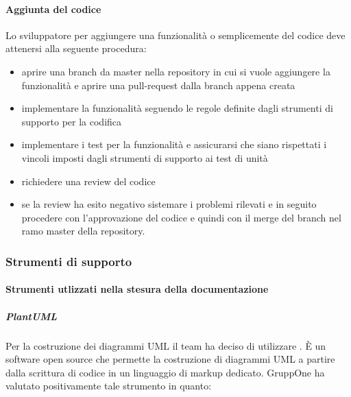 \documentclass[../../norme-di-progetto.tex]{subfiles}
\begin{document}
\paragraph{Aggiunta del codice}%
\label{par:aggiunta_codice}
Lo sviluppatore per aggiungere una funzionalità o semplicemente del codice deve attenersi alla seguente procedura:
\begin{itemize}
  \item aprire una branch da master nella repository in cui si vuole aggiungere la funzionalità e aprire una pull-request dalla branch appena creata
  \item implementare la funzionalità seguendo le regole definite dagli strumenti di supporto per la codifica
  \item implementare i test per la funzionalità e assicurarsi che siano rispettati i vincoli imposti dagli strumenti di supporto ai test di unità
  \item richiedere una review del codice
  \item se la review ha esito negativo sistemare i problemi rilevati e in seguito procedere con l'approvazione del codice e quindi con il merge del branch nel ramo master della repository.
\end{itemize}





\subsubsection{Strumenti di supporto}%
\label{subs:strumenti_di_supporto}

\paragraph{Strumenti utlizzati nella stesura della documentazione}%
\label{par:strumenti_utlizzati_nella_stesura_della_documentazione}

\subparagraph{PlantUML}%
\label{subp:plantuml}
Per la costruzione dei diagrammi UML il team ha deciso di utilizzare \@.
È un software open source che permette la costruzione di diagrammi UML a partire dalla scrittura di codice in un linguaggio di markup dedicato. GruppOne ha valutato positivamente tale strumento in quanto:
\end{document}
